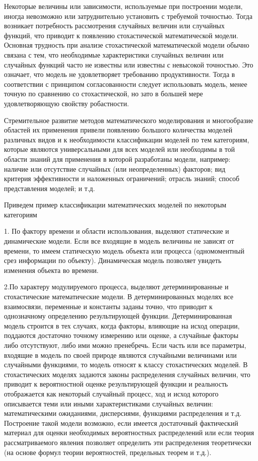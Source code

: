 Некоторые величины или зависимости, используемые при построении модели, иногда невозможно или затруднительно установить с требуемой точностью. Тогда возникает потребность рассмотрения случайных величин или случайных функций, что приводит к появлению стохастической математической модели.
Основная трудность при анализе стохастической математической модели обычно связана с тем, что необходимые характеристики случайных величин или случайных функций часто не известны или известны с невысокой точностью. Это означает, что модель не удовлетворяет требованию продуктивности. Тогда в соответствии с принципом согласованности следует использовать модель, менее точную по сравнению со стохастической, но зато в большей мере удовлетворяющую свойству робастности.




Стремительное развитие методов математического моделирования и многообразие областей их применения привели появлению большого количества моделей различных видов и к необходимости классификации моделей по тем категориям, которые являются универсальными для всех моделей или необходимы в той области знаний для применения в которой разработаны модели, например: наличие или отсутствие случайных (или неопределенных) факторов; вид критерия эффективности и наложенных ограничений; отрасль знаний; способ представления моделей; и т.д.


Приведем пример классификации математических моделей по некоторым категориям


1. По фактору времени и области использования, выделяют статические и динамические модели. Если все входящие в модель величины не зависят от времени, то имеем статическую модель объекта или процесса (одномоментный срез информации по объекту). Динамическая модель позволяет увидеть изменения объекта во времени.


2.По характеру модулируемого процесса, выделяют  детерминированные и стохастические математические модели. В детерминированных моделях все взаимосвязи, переменные и константы заданы точно, что приводит к однозначному определению результирующей функции. Детерминированная модель строится в тех случаях, когда факторы, влияющие на исход операции, поддаются достаточно точному измерению или оценке, а случайные факторы либо отсутствуют, либо ими можно пренебречь.
Если часть или все параметры, входящие в модель по своей природе являются случайными величинами или случайными функциями, то модель относят к классу стохастических моделей. В стохастических моделях задаются законы распределения случайных величин, что приводит к вероятностной оценке результирующей функции и реальность отображается как некоторый случайный процесс, ход и исход которого описывается теми или иными характеристиками случайных величин: математическими ожиданиями, дисперсиями, функциями распределения и т.д. Построение такой модели возможно, если имеется достаточный фактический материал для оценки необходимых вероятностных распределений или если теория рассматриваемого явления позволяет определить эти распределения теоретически (на основе формул теории вероятностей, предельных теорем и т.д.).


